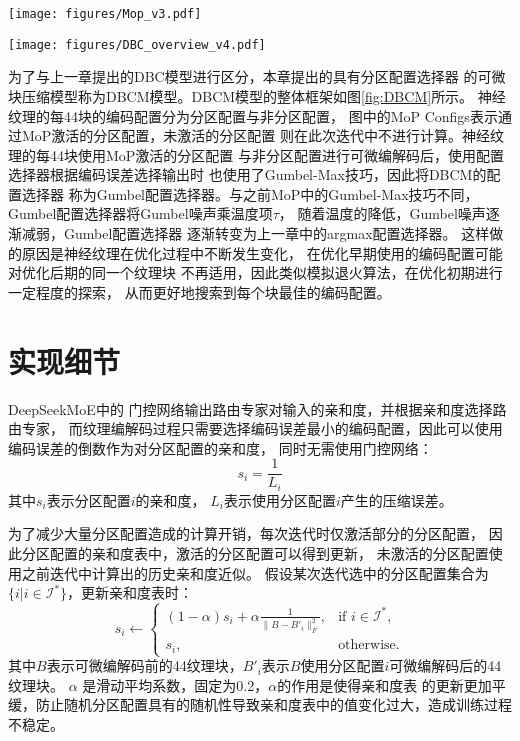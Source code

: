 \begin{figure*}[htbp]
    \centering
    \texttt{[image: figures/Mop\_v3.pdf]}
    \caption{基于混合专家模型的分区配置选择器(MoP)}
    \label{fig:Mop}
\end{figure*}

\begin{figure*}[htbp]
    \centering
    \texttt{[image: figures/DBC\_overview\_v4.pdf]}
    \caption{基于MoP的DBCM模型的整体框架}
    \label{fig:DBCM}
\end{figure*}

为了与上一章提出的DBC模型进行区分，本章提出的具有分区配置选择器
的可微块压缩模型称为DBCM模型。DBCM模型的整体框架如图\ref{fig:DBCM}所示。
神经纹理的每4\times4块的编码配置分为分区配置与非分区配置，
图中的MoP Configs表示通过MoP激活的分区配置，未激活的分区配置
则在此次迭代中不进行计算。神经纹理的每4\times4块使用MoP激活的分区配置
与非分区配置进行可微编解码后，使用配置选择器根据编码误差选择输出时
也使用了Gumbel-Max技巧，因此将DBCM的配置选择器
称为Gumbel配置选择器。与之前MoP中的Gumbel-Max技巧不同，
Gumbel配置选择器将Gumbel噪声乘温度项$\tau$，
随着温度的降低，Gumbel噪声逐渐减弱，Gumbel配置选择器
逐渐转变为上一章中的argmax配置选择器。
这样做的原因是神经纹理在优化过程中不断发生变化，
在优化早期使用的编码配置可能对优化后期的同一个纹理块
不再适用，因此类似模拟退火算法，在优化初期进行一定程度的探索，
从而更好地搜索到每个块最佳的编码配置。

\section{实现细节}

DeepSeekMoE\cite{dai2024deepseekmoe}中的
门控网络输出路由专家对输入的亲和度，并根据亲和度选择路由专家，
而纹理编解码过程只需要选择编码误差最小的编码配置，因此可以使用编码误差的倒数作为对分区配置的亲和度，
同时无需使用门控网络：
\begin{equation}
s_i=\frac{1}{L_i}
\end{equation}
其中$s_i$表示分区配置$i$的亲和度，
$L_i$表示使用分区配置$i$产生的压缩误差。

为了减少大量分区配置造成的计算开销，每次迭代时仅激活部分的分区配置，
因此分区配置的亲和度表中，激活的分区配置可以得到更新，
未激活的分区配置使用之前迭代中计算出的历史亲和度近似。
假设某次迭代选中的分区配置集合为$\{i|i\in\mathcal{I}^*\}$，更新亲和度表时：
\begin{equation}
    s_i\leftarrow
    \begin{cases} 
        (1-\alpha)s_i+\alpha\frac{1}{\|B-B'_i\|_F^2}, & \text{if } i\in\mathcal{I}^*,\\
    s_i, & \text{otherwise}.
    \end{cases}
\end{equation}
其中$B$表示可微编解码前的4\times4纹理块，$B'_i$表示$B$使用分区配置$i$可微编解码后的4\times4纹理块。
$\alpha$ 是滑动平均系数，固定为0.2，$\alpha$的作用是使得亲和度表
的更新更加平缓，防止随机分区配置具有的随机性导致亲和度表中的值变化过大，造成训练过程不稳定。

